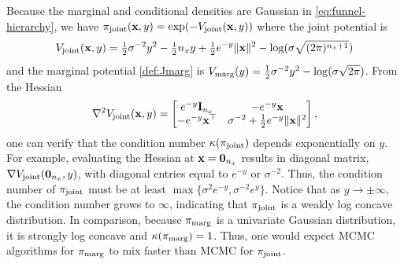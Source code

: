 \documentclass[onefignum,onetabnum]{siamonline250211}
\renewcommand{\t} {^{\top}}                                %
\newcommand{\bfI}{{\bf I}}
\newcommand{\bfx}{{\bf x}}
\newcommand{\nx}{{n_{x}}}
\newcommand{\pjoint}{\pi_{\rm joint}}
\newcommand{\pmarg}{\pi_{\rm marg}}
\begin{document}
%
Because the marginal and conditional densities are Gaussian in \eqref{eq:funnel-hierarchy}, we have $\pjoint(\bfx, y) = \exp(-V_{\rm joint}(\bfx, y))$ where the joint potential is
%
%
%
%
%
%
%
%
%
%
%
%
\begin{equation}\label{eq:joint_pontential_funnel}
  V_{\rm joint}(\bfx,y)
  =
  \tfrac{1}{2} \sigma^{-2}y^2
  -\tfrac{1}{2} \nx y
  +\tfrac{1}{2} e^{-y}\|\bfx\|^2 - \log(\sigma\sqrt{(2\pi)^{\nx+1}})
\end{equation}
and the marginal potential \eqref{def:Jmarg} is $V_{\rm marg}(y) = \tfrac{1}{2} \sigma^{-2}y^2 - \log(\sigma\sqrt{2\pi})$.
%
%
%
From the Hessian
%
\begin{equation}
  \label{eq:funnel-hessian}
  \nabla^2 V_{\rm joint}(\bfx,y)
  =
  \begin{bmatrix}
    e^{-y}\bfI_\nx & -e^{-y}\bfx \\
    -e^{-y}\bfx\t & \sigma^{-2}
      + \frac{1}{2}e^{-y}\|\bfx\|^2
  \end{bmatrix},
\end{equation}
one can verify that the condition number $\kappa(\pjoint)$ depends exponentially on $y$.
For example, evaluating the Hessian at $\bfx = {\bf0}_{\nx}$ results in diagonal matrix, $\nabla V_{\rm joint}({\bf0}_{\nx}, y)$, with diagonal entries equal to $e^{-y}$ or $\sigma^{-2}$.
Thus, the condition number of $\pjoint$ must be at least $\max \{\sigma^2 e^{-y}, \sigma^{-2} e^y\}$.
Notice that as $y \to \pm \infty$, the condition number grows to $\infty$, indicating that $\pjoint$ is a weakly log concave distribution.
In comparison, because $\pmarg$ is a univariate Gaussian distribution, it is strongly log concave and $\kappa(\pmarg) = 1$.
Thus, one would expect MCMC algorithms for $\pmarg$ to mix faster than MCMC for $\pjoint$.
%
%
%

%

%
\def\h{0.5}
\end{document}
